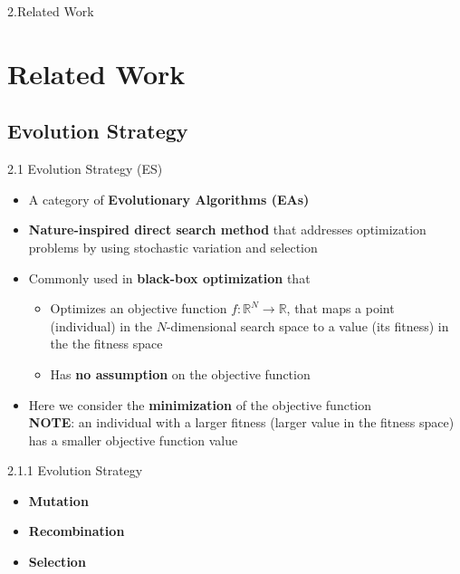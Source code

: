 \documentclass{beamer}
\begin{document}
\begin{frame}[plain,c]
\begin{center}
\Huge 2.Related Work
\end{center}
\end{frame}
\section{Related Work}


\subsection{Evolution Strategy}
\begin{frame}{2.1 Evolution Strategy (ES)}
\begin{itemize}
    \item A category of \textbf{Evolutionary Algorithms (EAs)}
    \item \textbf{Nature-inspired direct search method} that addresses optimization problems by using stochastic variation and selection 
    \item Commonly used in \textbf{black-box optimization} that
    \begin{itemize}
        \item Optimizes an objective function $f:\mathbb{R}^N \rightarrow \mathbb{R}$, that maps a point (individual) in the $N$-dimensional search space to a value (its fitness) in the the fitness space
        \item Has \textbf{no assumption} on the objective function
    \end{itemize}
    \item  Here we consider the \textbf{minimization} of the objective function  \\
    \textbf{NOTE}: an individual with a larger fitness (larger value in the fitness space) has a smaller objective function value

    
\end{itemize}
\end{frame}

\begin{frame}{2.1.1 Evolution Strategy}
\begin{itemize}
    \item \textbf{Mutation}  
    \\
    \item \textbf{Recombination}
    
    \item \textbf{Selection} 
\end{itemize}
\end{frame}
\end{document}

